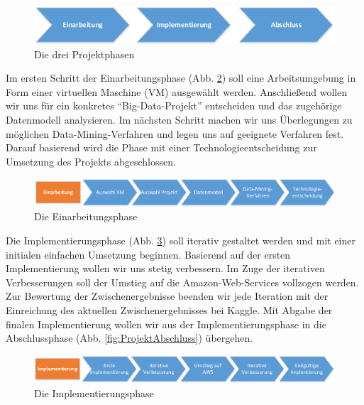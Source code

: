 \begin{figure}[H]
\centering
\includegraphics[width=0.8\linewidth]{Bilder/ProjektplanAllgemein}
\caption{Die drei Projektphasen}
\label{fig:ProjektplanAllgemein}
\end{figure}

Im ersten Schritt der Einarbeitungsphase (Abb. \ref{fig:ProjektEinarbeitung}) soll eine Arbeitsumgebung in Form einer virtuellen Maschine (VM) ausgewählt werden. Anschließend wollen wir uns für ein konkretes "`Big-Data-Projekt"' entscheiden und das zugehörige Datenmodell analysieren. Im nächsten Schritt machen wir uns Überlegungen zu möglichen Data-Mining-Verfahren und legen uns auf geeignete Verfahren fest. Darauf basierend wird die Phase mit einer Technologieentscheidung zur Umsetzung des Projekts abgeschlossen.

\begin{figure}[h]
\centering
\includegraphics[width=1\linewidth]{Bilder/ProjektEinarbeitung}
\caption{Die Einarbeitungsphase}
\label{fig:ProjektEinarbeitung}
\end{figure}

Die Implementierungsphase (Abb. \ref{fig:ProjektImplementierung}) soll iterativ gestaltet werden und mit einer initialen einfachen Umsetzung beginnen. Basierend auf der ersten Implementierung wollen wir uns stetig verbessern. Im Zuge der iterativen Verbesserungen soll der Umstieg auf die Amazon-Web-Services vollzogen werden. Zur Bewertung der Zwischenergebnisse beenden wir jede Iteration mit der Einreichung des aktuellen Zwischenergebnisses bei Kaggle. Mit Abgabe der finalen Implementierung wollen wir aus der Implementierungsphase in die Abschlussphase (Abb. \ref{fig:ProjektAbschluss}) übergehen.

\begin{figure}[h]
\centering
\includegraphics[width=1\linewidth]{Bilder/ProjektImplementierung}
\caption{Die Implementierungsphase}
\label{fig:ProjektImplementierung}
\end{figure}

